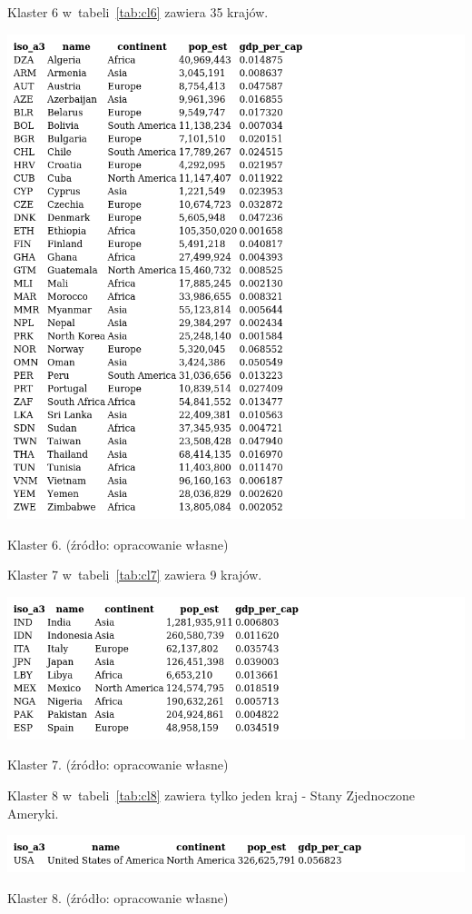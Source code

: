 \documentclass[11pt]{report}
\begin{document}
    Klaster 6 w~tabeli~\ref{tab:cl6} zawiera 35 krajów.
    \begin{table}[!htp]
        \centering
        \includegraphics[width=\linewidth]{tables/CLUST/clust6kmeans.png}
        \caption{Klaster 6. (źródło: opracowanie własne)}
        \label{tab:cl6}
    \end{table}

    Klaster 7 w~tabeli~\ref{tab:cl7} zawiera 9 krajów.
    \begin{table}[!htp]
        \centering
        \includegraphics[width=\linewidth]{tables/CLUST/clust7kmeans.png}
        \caption{Klaster 7. (źródło: opracowanie własne)}
        \label{tab:cl7}
    \end{table}

    Klaster 8 w~tabeli~\ref{tab:cl8} zawiera tylko jeden kraj - Stany Zjednoczone Ameryki.
    \begin{table}[!htp]
        \centering
        \includegraphics[width=\linewidth]{tables/CLUST/clust8kmeans.png}
        \caption{Klaster 8. (źródło: opracowanie własne)}
        \label{tab:cl8}
    \end{table}
\end{document}
